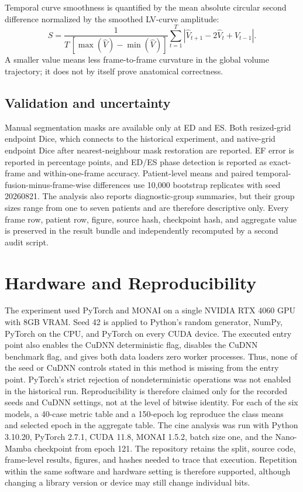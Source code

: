 Temporal curve smoothness is quantified by the mean absolute circular second difference normalized by the smoothed LV-curve amplitude:
\begin{equation}
    S=\frac{1}{T\,[\max(\widehat V)-\min(\widehat V)]}
    \sum_{t=1}^{T}\left|\widehat V_{t+1}-2\widehat V_t+\widehat V_{t-1}\right|.
\end{equation}
A smaller value means less frame-to-frame curvature in the global volume trajectory; it does not by itself prove anatomical correctness.

\subsection{Validation and uncertainty}
Manual segmentation masks are available only at ED and ES. Both resized-grid endpoint Dice, which connects to the historical experiment, and native-grid endpoint Dice after nearest-neighbour mask restoration are reported. EF error is reported in percentage points, and ED/ES phase detection is reported as exact-frame and within-one-frame accuracy. Patient-level means and paired temporal-fusion-minus-frame-wise differences use 10,000 bootstrap replicates with seed 20260821. The analysis also reports diagnostic-group summaries, but their group sizes range from one to seven patients and are therefore descriptive only. Every frame row, patient row, figure, source hash, checkpoint hash, and aggregate value is preserved in the result bundle and independently recomputed by a second audit script.

\section{Hardware and Reproducibility}
The experiment used PyTorch \citep{paszke2019pytorch} and MONAI on a single
NVIDIA RTX 4060 GPU with 8GB VRAM. Seed 42 is applied to Python's random
generator, NumPy, PyTorch on the CPU, and PyTorch on every CUDA device. The
executed entry point also enables the CuDNN deterministic flag, disables the
CuDNN benchmark flag, and gives both data loaders zero worker processes. Thus,
none of the seed or CuDNN controls stated in this method is missing from the
entry point. PyTorch's strict rejection of nondeterministic operations was not
enabled in the historical run. Reproducibility is therefore claimed only for the
recorded seeds and CuDNN settings, not at the level of bitwise identity. For each
of the six models, a 40-case metric table and a 150-epoch log reproduce the class
means and selected epoch in the aggregate table. The cine analysis was run with
Python 3.10.20, PyTorch 2.7.1, CUDA 11.8, MONAI 1.5.2, batch size one, and the
Nano-Mamba checkpoint from epoch 121. The repository retains the split, source
code, frame-level results, figures, and hashes needed to trace that execution.
Repetition within the same software and hardware setting is therefore supported,
although changing a library version or device may still change individual bits.

